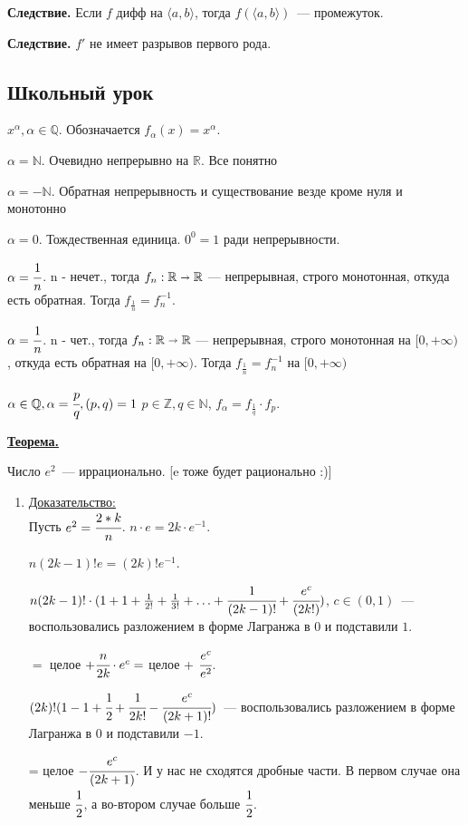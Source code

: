 \documentclass{article}
\newcommand{\thmm}[1]{\underline{\textbf{#1}}}
\newcommand{\prooff}[1]{{\underline{Доказательство:}} \\ }
\begin{document}
\textbf{Следствие.} Если $f$ дифф на $\langle a,b \rangle $, тогда $f(\langle a,b \rangle)$~--- промежуток.

\textbf{Следствие.} $f' $ не имеет разрывов первого рода.
\pagebreak

\subsection{Школьный урок}

$x^\alpha, \alpha \in \mathbb{Q}$. Обозначается $f_{\alpha}(x) =x^\alpha$.

$\alpha = \mathbb{N}$.  Очевидно непрерывно на $\mathbb{R}$. Все понятно

$\alpha = -\mathbb{N}$. Обратная непрерывность и существование везде кроме нуля и монотонно

$\alpha = 0$. Тождественная единица. $0^0 = 1$ ради непрерывности.

$\alpha = \cfrac{1}{n}$. n - нечет., тогда $f_n: \mathbb{R} \shortrightarrow \mathbb{R}$ --- непрерывная, строго монотонная, откуда есть обратная. Тогда  $f_{\frac{1}{n}}=f_n^{-1}$.

$\alpha = \cfrac{1}{n}$. n - чет., тогда $f_n: \mathbb{R} \shortrightarrow \mathbb{R}$ --- непрерывная, строго монотонная на $[0, +\infty)$ , откуда есть обратная на $[0, +\infty)$. Тогда  $f_{\frac{1}{n}}=f_n^{-1}$ на $[0, +\infty)$

$\alpha \in \mathbb{Q}, \alpha  = \cfrac{p}{q}, (p,q) =1$ $p \in \mathbb{Z}, q \in \mathbb{N}$, $f_\alpha = f_\frac{1}{q} \cdot f_p$.

\thmm{Теорема.} 

Число $e^2$~--- иррационально. [e тоже будет рационально :)]

\begin{enumerate}
    \item[] \prooff{}
    Пусть $e^2 = \cfrac{2*k}{n}$. $n \cdot e = 2k \cdot e^{-1}$.

    $n(2k-1)! e = (2k)! e^{-1}$.

    $n(2k-1)! \cdot (1 + 1 + \frac{1}{2!} + \frac{1}{3!} + \ldots +\cfrac{1}{(2k-1)!}+ \cfrac{e^c}{(2k!)})$, $c \in (0,1)$~--- воспользовались разложением в форме Лагранжа в $0$ и подставили $1$.

    $=$ целое $+ \cfrac{n}{2k}\cdot e^c = $ целое + $\cfrac{e^c}{e^2}$.

    $(2k)! (1 - 1 + \cfrac{1}{2} + \cfrac{1}{2k!} - \cfrac{e^c}{(2k+1)!})$~--- воспользовались разложением в форме Лагранжа в $0$ и подставили $-1$.
    
    = целое $- \cfrac{e^c}{(2k+1)}$. И у нас не сходятся дробные части. В первом случае она меньше $\cfrac{1}{2}$, а во-втором случае больше $\cfrac{1}{2}$.
\end{enumerate}
\end{document}

